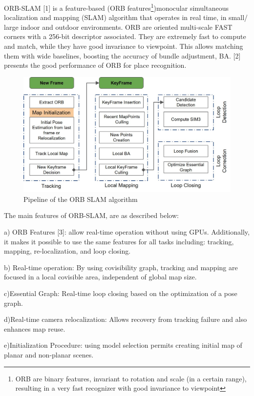 ORB-SLAM [1] is a feature-based (ORB features\footnote{ORB are binary features, invariant to rotation and scale (in a certain range), resulting in a very fast recognizer with good invariance to viewpoint})monocular simultaneous localization and mapping (SLAM) algorithm that operates in real time, in small/ large indoor and outdoor environments. ORB are oriented multi-scale FAST corners with a 256-bit descriptor associated. They are extremely fast to compute and match, while they have good invariance to viewpoint. This allows matching them with wide baselines, boosting the accuracy of bundle adjustment, BA. [2] presents the good performance of ORB for place recognition.

\begin{figure}[H]
	\centering
	\includegraphics[width=1.0\linewidth]{figures/orb_slam_pipeline}
	\caption{Pipeline of the ORB SLAM algorithm}
	\label{fig:orbslampipeline}
\end{figure}

The main features of ORB-SLAM, are as described below:

a) ORB Features [3]: allow real-time operation without using GPUs. Additionally, it makes it possible to use the same features for all tasks including: tracking, mapping, re-localization, and loop closing.

b) Real-time operation: By using covisibility graph, tracking and mapping are focused in a local covisible area, independent of global map size.

c)Essential Graph: Real-time loop closing based on the optimization of a pose graph.

d)Real-time camera relocalization: Allows recovery from tracking failure and also enhances map reuse.

e)Initialization Procedure: using model selection permits creating initial map of planar and non-planar scenes.

